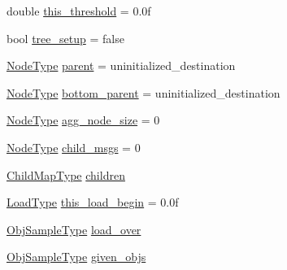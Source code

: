 \begin{DoxyCompactItemize}
\item 
double \hyperlink{structvt_1_1vrt_1_1collection_1_1lb_1_1_hierarchical_l_b_a7a1f6d8e3b327da08a682b344c7eaa08}{this\+\_\+threshold} = 0.\+0f
\item 
bool \hyperlink{structvt_1_1vrt_1_1collection_1_1lb_1_1_hierarchical_l_b_abd4e7b54c632de1dc2f2751676328f3d}{tree\+\_\+setup} = false
\item 
\hyperlink{namespacevt_a866da9d0efc19c0a1ce79e9e492f47e2}{Node\+Type} \hyperlink{structvt_1_1vrt_1_1collection_1_1lb_1_1_hierarchical_l_b_a92d34872e6196a0ba2e2097e944d05cc}{parent} = uninitialized\+\_\+destination
\item 
\hyperlink{namespacevt_a866da9d0efc19c0a1ce79e9e492f47e2}{Node\+Type} \hyperlink{structvt_1_1vrt_1_1collection_1_1lb_1_1_hierarchical_l_b_a613ebde72cb389a12eb7a522e0a5a690}{bottom\+\_\+parent} = uninitialized\+\_\+destination
\item 
\hyperlink{namespacevt_a866da9d0efc19c0a1ce79e9e492f47e2}{Node\+Type} \hyperlink{structvt_1_1vrt_1_1collection_1_1lb_1_1_hierarchical_l_b_aa2ef8e33aaed4f1ae6405a3652de21bc}{agg\+\_\+node\+\_\+size} = 0
\item 
\hyperlink{namespacevt_a866da9d0efc19c0a1ce79e9e492f47e2}{Node\+Type} \hyperlink{structvt_1_1vrt_1_1collection_1_1lb_1_1_hierarchical_l_b_aebc5548aa06994f3dffd752a36789d80}{child\+\_\+msgs} = 0
\item 
\hyperlink{structvt_1_1vrt_1_1collection_1_1lb_1_1_hierarchical_l_b_a95e5a93033703216cad8ec7a3da7a2ef}{Child\+Map\+Type} \hyperlink{structvt_1_1vrt_1_1collection_1_1lb_1_1_hierarchical_l_b_af79c0b7d47eb39f311a1a604863bd6c4}{children}
\item 
\hyperlink{structvt_1_1vrt_1_1collection_1_1lb_1_1_base_l_b_a215e22b9f12678303f49615ae3be05cc}{Load\+Type} \hyperlink{structvt_1_1vrt_1_1collection_1_1lb_1_1_hierarchical_l_b_a2d4333062fc0c28e7774b23300893889}{this\+\_\+load\+\_\+begin} = 0.\+0f
\item 
\hyperlink{structvt_1_1vrt_1_1collection_1_1lb_1_1_load_sampler_base_l_b_a8d939a849ec0d6371c1c4d441ffb9b94}{Obj\+Sample\+Type} \hyperlink{structvt_1_1vrt_1_1collection_1_1lb_1_1_hierarchical_l_b_aced5f1ddf40eb67f0a86ebe56d75d22c}{load\+\_\+over}
\item 
\hyperlink{structvt_1_1vrt_1_1collection_1_1lb_1_1_load_sampler_base_l_b_a8d939a849ec0d6371c1c4d441ffb9b94}{Obj\+Sample\+Type} \hyperlink{structvt_1_1vrt_1_1collection_1_1lb_1_1_hierarchical_l_b_a010367d94903aa52b9e48ecc715820c6}{given\+\_\+objs}

\end{DoxyCompactItemize}
